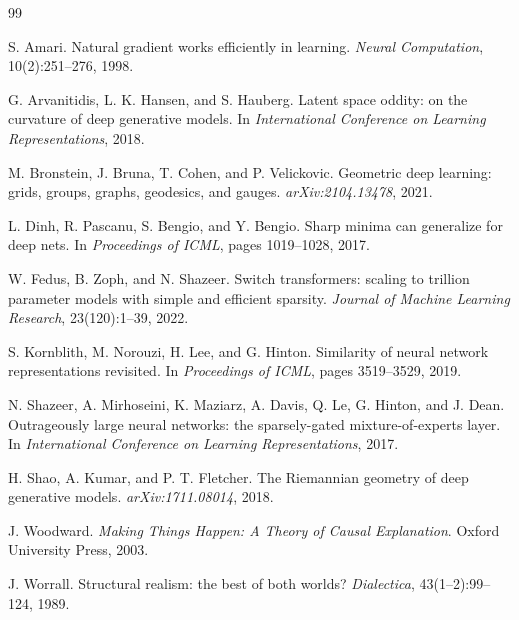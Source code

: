 \documentclass[11pt,a4paper]{article}
\begin{document}
\begin{thebibliography}{99}

S. Amari.
\newblock Natural gradient works efficiently in learning.
\newblock \emph{Neural Computation}, 10(2):251--276, 1998.

G. Arvanitidis, L. K. Hansen, and S. Hauberg.
\newblock Latent space oddity: on the curvature of deep generative models.
\newblock In \emph{International Conference on Learning Representations}, 2018.

M. Bronstein, J. Bruna, T. Cohen, and P. Velickovic.
\newblock Geometric deep learning: grids, groups, graphs, geodesics, and gauges.
\newblock \emph{arXiv:2104.13478}, 2021.

L. Dinh, R. Pascanu, S. Bengio, and Y. Bengio.
\newblock Sharp minima can generalize for deep nets.
\newblock In \emph{Proceedings of ICML}, pages 1019--1028, 2017.

W. Fedus, B. Zoph, and N. Shazeer.
\newblock Switch transformers: scaling to trillion parameter models with simple and efficient sparsity.
\newblock \emph{Journal of Machine Learning Research}, 23(120):1--39, 2022.

S. Kornblith, M. Norouzi, H. Lee, and G. Hinton.
\newblock Similarity of neural network representations revisited.
\newblock In \emph{Proceedings of ICML}, pages 3519--3529, 2019.

N. Shazeer, A. Mirhoseini, K. Maziarz, A. Davis, Q. Le, G. Hinton, and J. Dean.
\newblock Outrageously large neural networks: the sparsely-gated mixture-of-experts layer.
\newblock In \emph{International Conference on Learning Representations}, 2017.

H. Shao, A. Kumar, and P. T. Fletcher.
\newblock The Riemannian geometry of deep generative models.
\newblock \emph{arXiv:1711.08014}, 2018.

J. Woodward.
\newblock \emph{Making Things Happen: A Theory of Causal Explanation}.
\newblock Oxford University Press, 2003.

J. Worrall.
\newblock Structural realism: the best of both worlds?
\newblock \emph{Dialectica}, 43(1--2):99--124, 1989.

\end{thebibliography}
\end{document}
